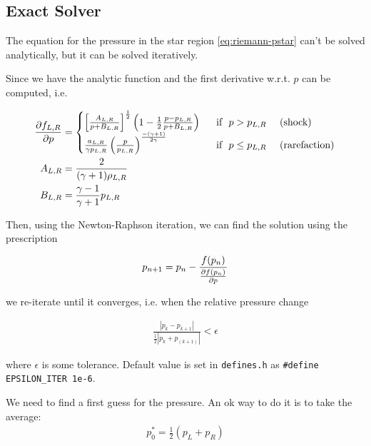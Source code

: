 \subsection{Exact Solver}


The equation for the pressure in the star region \ref{eq:riemann-pstar} can't be solved analytically, but it can be solved iteratively.

Since we have the analytic function and the first derivative w.r.t. $p$ can be computed, i.e.

\begin{align*}
	\frac{\partial f_{L,R}}{\partial p} &= 
		\begin{cases}
			\left[ \frac{A_{L,R}}{p + B_{L,R}} \right]^{\frac{1}{2}} \left( 1 - \frac{1}{2} \frac{p - p_{L,R}}{p + B_{L,R}} \right) 
				& ~\text{ if } ~ p > p_{L,R} ~ \quad \text{(shock)} \\
			\frac{a_{L,R}}{\gamma p_{L,R}}  \left( \frac{p}{p_{L,R}} \right)^ \frac{-(\gamma+1)}{2 \gamma}
				& ~\text{ if } ~ p \leq p_{L,R} ~ \quad \text{(rarefaction)} \label{eq:riemann-pstar-dp}\\
		\end{cases} \\
	A_{L,R} &= 
		\frac{2}{(\gamma + 1) \rho_{L,R}}\\
	B_{L,R} &= 
		\frac{\gamma - 1}{\gamma + 1} p_{L,R}
\end{align*}


Then, using the Newton-Raphson iteration, we can find the solution using the prescription

\begin{align}
	p_{n+1} = p_n - \frac{f(p_n)}{\frac{\partial f(p_n)}{\partial p}}
\end{align}


we re-iterate until it converges, i.e. when the relative pressure change 

\begin{align}
	\frac{|p_k - p_{k+1}|}{\frac{1}{2} | p_k + p_(k+1) | } < \epsilon
\end{align}

where $\epsilon$ is some tolerance. Default value is set in \texttt{defines.h} as \verb|#define EPSILON_ITER 1e-6|.


We need to find a first guess for the pressure. 
An ok way to do it is to take the average:
\begin{align*}
	p_0^* = \frac{1}{2} (p_L + p_R)
\end{align*}

